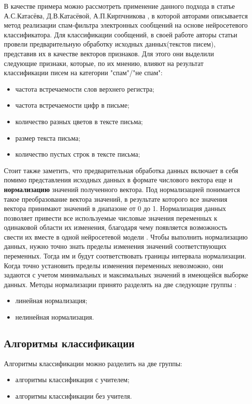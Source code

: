 В качестве примера можно рассмотреть применение данного подхода в статье А.С.Катасёва, Д.В.Катасёвой, А.П.Кирпчникова \cite{spam-filter}, в которой авторами описывается метод реализации спам-фильтра электронных сообщений на основе нейросетевого классификатора. Для классификации сообщений, в своей работе авторы статьи провели предварительную обработку исходных данных(текстов писем), представив их в качестве векторов признаков. Для этого они выделили следующие признаки, которые, по их мнению, влияют на результат классификации писем на категории "спам"/"не спам":
\begin{itemize}
	\item частота встречаемости слов верхнего регистра;
	\item частота встречаемости цифр в письме;
	\item количество разных цветов в тексте письма;
	\item размер текста письма;
	\item количество пустых строк в тексте письма;
\end{itemize}

\vspace{\baselineskip}

Стоит также заметить, что предварительная обработка данных включает в себя помимо представления исходных данных в формате числового вектора еще и \textbf{нормализацию} значений полученного вектора. Под нормализацией понимается такое преобразование вектора значений, в результате которого все значения вектора принимают значений в диапазоне от 0 до 1. Нормализация данных позволяет привести все используемые числовые значения переменных к одинаковой области их изменения, благодаря чему появляется возможность свести их вместе в одной нейросетевой модели \cite{AI-portal}.
Чтобы выполнить нормализацию данных, нужно точно знать пределы изменения значений соответствующих переменных. Тогда им и будут соответствовать границы интервала нормализации. Когда точно установить пределы изменения переменных невозможно, они задаются с учетом минимальных и максимальных значений в имеющейся выборке данных.
Методы нормализации принято разделять на две следующие группы \cite{AI-portal}:
\begin{itemize}
	\item линейная нормализация;
	\item нелинейная нормализация.
\end{itemize}


\subsection{Алгоритмы классификации}
Алгоритмы классификации можно разделить на две группы:
\begin{itemize}
	\item алгоритмы классификация с учителем;
	\item алгоритмы классификации без учителя. 
\end{itemize}

